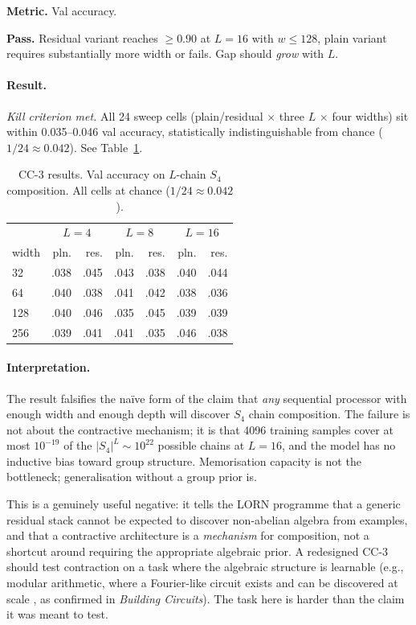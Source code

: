 \documentclass[10pt, twocolumn, a4paper]{article}
\begin{document}
\textbf{Metric.} Val accuracy.

\textbf{Pass.} Residual variant reaches $\ge 0.90$ at $L=16$ with $w \le 128$, plain variant requires substantially more width or fails. Gap should \emph{grow} with $L$.

\paragraph{Result.} \emph{Kill criterion met.} All 24 sweep cells (plain/residual $\times$ three $L$ $\times$ four widths) sit within 0.035--0.046 val accuracy, statistically indistinguishable from chance ($1/24 \approx 0.042$). See Table~\ref{tab:cc3}.

\begin{table}[t]
\centering\small
\caption{CC-3 results. Val accuracy on $L$-chain $S_4$ composition. All cells at chance ($1/24 \approx 0.042$).}
\label{tab:cc3}
\begin{tabular}{l *{6}{r}}
\toprule
 & \multicolumn{2}{c}{$L=4$} & \multicolumn{2}{c}{$L=8$} & \multicolumn{2}{c}{$L=16$} \\
width & pln. & res. & pln. & res. & pln. & res. \\
\midrule
32  & .038 & .045 & .043 & .038 & .040 & .044 \\
64  & .040 & .038 & .041 & .042 & .038 & .036 \\
128 & .040 & .046 & .035 & .045 & .039 & .039 \\
256 & .039 & .041 & .041 & .035 & .046 & .038 \\
\bottomrule
\end{tabular}
\end{table}

\paragraph{Interpretation.} The result falsifies the na\"{i}ve form of the claim that \emph{any} sequential processor with enough width and enough depth will discover $S_4$ chain composition. The failure is not about the contractive mechanism; it is that 4096 training samples cover at most $10^{-19}$ of the $|S_4|^L \sim 10^{22}$ possible chains at $L=16$, and the model has no inductive bias toward group structure. Memorisation capacity is not the bottleneck; generalisation without a group prior is.

This is a genuinely useful negative: it tells the LORN programme that a generic residual stack cannot be expected to discover non-abelian algebra from examples, and that a contractive architecture is a \emph{mechanism} for composition, not a shortcut around requiring the appropriate algebraic prior. A redesigned CC-3 should test contraction on a task where the algebraic structure is learnable (e.g., modular arithmetic, where a Fourier-like circuit exists and can be discovered at scale ,  as confirmed in \emph{Building Circuits}). The task here is harder than the claim it was meant to test.
\end{document}

